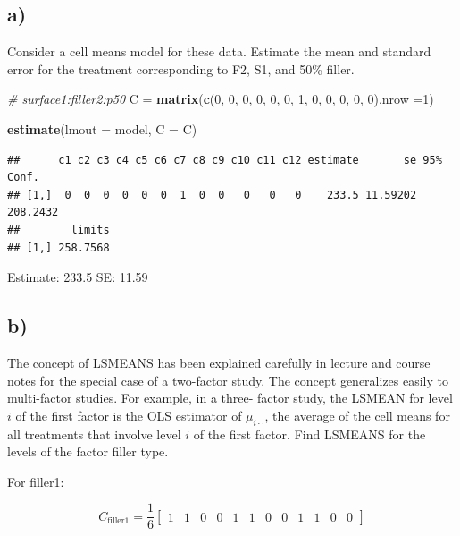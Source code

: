 \documentclass[
]{article}
\newenvironment{Shaded}{\begin{snugshade}}{\end{snugshade}}
\newcommand{\AttributeTok}[1]{\textcolor[rgb]{0.13,0.29,0.53}{#1}}
\newcommand{\CommentTok}[1]{\textcolor[rgb]{0.56,0.35,0.01}{\textit{#1}}}
\newcommand{\DecValTok}[1]{\textcolor[rgb]{0.00,0.00,0.81}{#1}}
\newcommand{\FunctionTok}[1]{\textcolor[rgb]{0.13,0.29,0.53}{\textbf{#1}}}
\newcommand{\NormalTok}[1]{#1}
\newcommand{\OtherTok}[1]{\textcolor[rgb]{0.56,0.35,0.01}{#1}}
\begin{document}
\subsection{a)}\label{a-1}

Consider a cell means model for these data. Estimate the mean and
standard error for the treatment corresponding to F2, S1, and 50\%
filler.

\begin{Shaded}
\begin{Highlighting}[]
\CommentTok{\# surface1:filler2:p50}
\NormalTok{C }\OtherTok{=} \FunctionTok{matrix}\NormalTok{(}\FunctionTok{c}\NormalTok{(}\DecValTok{0}\NormalTok{, }\DecValTok{0}\NormalTok{, }\DecValTok{0}\NormalTok{, }\DecValTok{0}\NormalTok{, }\DecValTok{0}\NormalTok{, }\DecValTok{0}\NormalTok{, }
             \DecValTok{1}\NormalTok{, }\DecValTok{0}\NormalTok{, }\DecValTok{0}\NormalTok{, }\DecValTok{0}\NormalTok{, }\DecValTok{0}\NormalTok{, }\DecValTok{0}\NormalTok{),}\AttributeTok{nrow =}\DecValTok{1}\NormalTok{)}

\FunctionTok{estimate}\NormalTok{(}\AttributeTok{lmout =}\NormalTok{ model, }\AttributeTok{C =}\NormalTok{ C)}
\end{Highlighting}
\end{Shaded}

\begin{verbatim}
##      c1 c2 c3 c4 c5 c6 c7 c8 c9 c10 c11 c12 estimate       se 95% Conf.
## [1,]  0  0  0  0  0  0  1  0  0   0   0   0    233.5 11.59202  208.2432
##        limits
## [1,] 258.7568
\end{verbatim}

Estimate: 233.5 SE: 11.59

\newpage

\subsection{b)}\label{b-1}

The concept of LSMEANS has been explained carefully in lecture and
course notes for the special case of a two-factor study. The concept
generalizes easily to multi-factor studies. For example, in a three-
factor study, the LSMEAN for level \(i\) of the first factor is the OLS
estimator of \(\bar{\mu}_{i \cdot \cdot}\), the average of the cell
means for all treatments that involve level \(i\) of the first factor.
Find LSMEANS for the levels of the factor filler type.

For filler1:

\[
C_{\text{filler1}} = \frac{1}{6}
\begin{bmatrix}
1 & 1 & 0 & 0 & 1 & 1 & 0 & 0 & 1 & 1 & 0 & 0
\end{bmatrix}
\]
\end{document}
